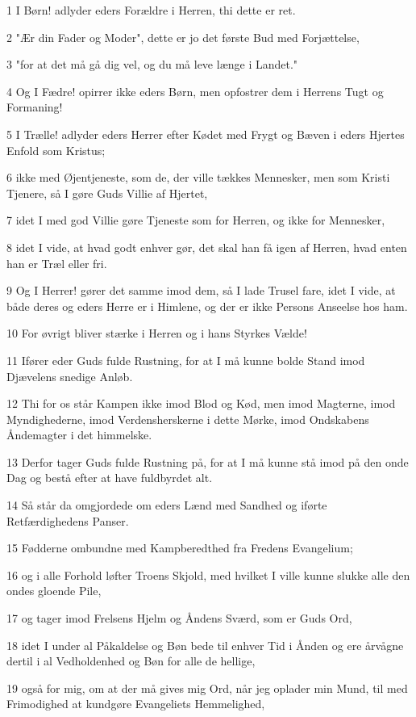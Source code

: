 \par 1 I Børn! adlyder eders Forældre i Herren, thi dette er ret.
\par 2 "Ær din Fader og Moder", dette er jo det første Bud med Forjættelse,
\par 3 "for at det må gå dig vel, og du må leve længe i Landet."
\par 4 Og I Fædre! opirrer ikke eders Børn, men opfostrer dem i Herrens Tugt og Formaning!
\par 5 I Trælle! adlyder eders Herrer efter Kødet med Frygt og Bæven i eders Hjertes Enfold som Kristus;
\par 6 ikke med Øjentjeneste, som de, der ville tækkes Mennesker, men som Kristi Tjenere, så I gøre Guds Villie af Hjertet,
\par 7 idet I med god Villie gøre Tjeneste som for Herren, og ikke for Mennesker,
\par 8 idet I vide, at hvad godt enhver gør, det skal han få igen af Herren, hvad enten han er Træl eller fri.
\par 9 Og I Herrer! gører det samme imod dem, så I lade Trusel fare, idet I vide, at både deres og eders Herre er i Himlene, og der er ikke Persons Anseelse hos ham.
\par 10 For øvrigt bliver stærke i Herren og i hans Styrkes Vælde!
\par 11 Ifører eder Guds fulde Rustning, for at I må kunne bolde Stand imod Djævelens snedige Anløb.
\par 12 Thi for os står Kampen ikke imod Blod og Kød, men imod Magterne, imod Myndighederne, imod Verdensherskerne i dette Mørke, imod Ondskabens Åndemagter i det himmelske.
\par 13 Derfor tager Guds fulde Rustning på, for at I må kunne stå imod på den onde Dag og bestå efter at have fuldbyrdet alt.
\par 14 Så står da omgjordede om eders Lænd med Sandhed og iførte Retfærdighedens Panser.
\par 15 Fødderne ombundne med Kampberedthed fra Fredens Evangelium;
\par 16 og i alle Forhold løfter Troens Skjold, med hvilket I ville kunne slukke alle den ondes gloende Pile,
\par 17 og tager imod Frelsens Hjelm og Åndens Sværd, som er Guds Ord,
\par 18 idet I under al Påkaldelse og Bøn bede til enhver Tid i Ånden og ere årvågne dertil i al Vedholdenhed og Bøn for alle de hellige,
\par 19 også for mig, om at der må gives mig Ord, når jeg oplader min Mund, til med Frimodighed at kundgøre Evangeliets Hemmelighed,
